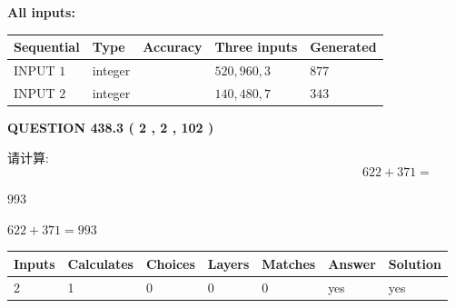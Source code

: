 \documentclass{ctexart}
\begin{document}
   
   
   
\noindent\vspace{0.1in}\hspace{-0.08in} {\textbf{\Large{All inputs: }}}
   
   
  
  
\noindent\begin{tabular}{|l|l|l|l|l|}
\hline
 Sequential & Type & Accuracy & Three inputs & Generated \\ 
\hline
 
 
  INPUT $  1 $ & integer &  & $
 520
 , 
 960
 , 
 3
 $ & $ 877 $ 
 \\  \hline  
 
 
  INPUT $  2 $ & integer &  & $
 140
 , 
 480
 , 
 7
 $ & $ 343 $ 
 \\  \hline  
 \end{tabular}
   
   
  
\vspace{0.2in}
  
{\textbf{\Large{QUESTION
438.3 
 ( 2 , 2 , 102 )
}}}
  
  
 
请计算:
\begin{equation}
622 +  %
371 = \nonumber
\end{equation}
 
 
 
\noindent{}
 
 

993
 
 
\noindent{}
 
 

 
 
 
\noindent{}
 
 

$ %
622 +  %
371=   %
993$
 
 
\noindent{}
 
 

 
   
   
   
   
\noindent\begin{tabular}{|l|l|l|l|l|l|l|}
 \hline
Inputs & Calculates & Choices & Layers & Matches & Answer & Solution \\ \hline
 2  & 
 1  & 
 0
  & 
 0  & 
 0  & 
  yes & 
  yes 
  \\ \hline
 \end{tabular}
   
\end{document}
